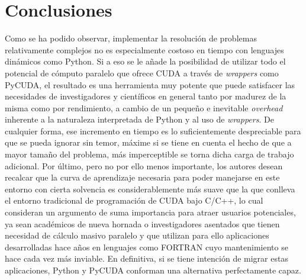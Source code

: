 \documentclass[twocolumn,twoside]{Jornadas}
\begin{document}
\balance
\section{Conclusiones}

Como se ha podido observar, implementar la resoluci\'{o}n de problemas relativamente complejos no es especialmente costoso en tiempo con lenguajes din\'{a}micos como Python. Si a eso se le a\~{n}ade la posibilidad de utilizar todo el potencial de c\'{o}mputo paralelo que ofrece CUDA a trav\'{e}s de \emph{wrappers} como PyCUDA, el resultado es una herramienta muy potente que puede satisfacer las necesidades de investigadores y cient\'{i}ficos en general tanto por madurez de la misma como por rendimiento, a cambio de un peque\~{n}o e inevitable \emph{overhead} inherente a la naturaleza interpretada de Python y al uso de \emph{wrappers}. De cualquier forma, ese incremento en tiempo es lo suficientemente despreciable para que se pueda ignorar sin temor, m\'{a}xime si se tiene en cuenta el hecho de que a mayor tama\~{n}o del problema, m\'{a}s imperceptible se torna dicha carga de trabajo adicional. Por \'{u}ltimo, pero no por ello menos importante, los autores desean recalcar que la curva de aprendizaje necesaria para poder manejarse en este entorno con cierta solvencia es considerablemente m\'{a}s suave que la que conlleva el entorno tradicional de programaci\'{o}n de CUDA bajo C/C++, lo cual consideran un argumento de suma importancia para atraer usuarios potenciales, ya sean acad\'{e}micos de nueva hornada o investigadores asentados que tienen necesidad de c\'{a}lculo masivo paralelo y que utilizan para ello aplicaciones desarrolladas hace a\~{n}os en lenguajes como FORTRAN cuyo mantenimiento se hace cada vez m\'{a}s inviable. En definitiva, si se tiene intenci\'{o}n de migrar estas aplicaciones, Python y PyCUDA conforman una alternativa perfectamente capaz.



\end{document}
